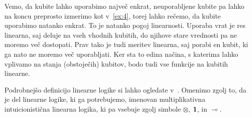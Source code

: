Vemo, da kubite lahko uporabimo največ enkrat, neuporabljene kubite pa lahko na koncu preprosto izmerimo kot v~\ref{ex:4}, torej lahko rečemo, da kubite uporabimo natanko enkrat.
To je natanko pogoj linearnosti.
Uporaba vrat je res linearna, saj deluje na vseh vhodnih kubitih, do njihove stare vrednosti pa ne moremo več dostopati.
Prav tako je tudi meritev linearna, saj porabi en kubit, ki ga nato ne moremo več uporabljati.
Ker sta to edina načina, s katerima lahko vplivamo na stanja (obstoječih) kubitov, bodo tudi vse funkcije na kubitih linearne.

Podrobnejšo definicijo linearne logike si lahko ogledate v~\cite{girard-linear-logic-1987,girard-linear-logic-1995, nlab:linear_logic}.
Omenimo zgolj to, da je del linearne logike, ki ga potrebujemo, imenovan multiplikativna intuicionistična linearna logika, ki pa vsebuje zgolj simbole \(⊗\), \(\mathbf{1}\), in \(⊸\).



